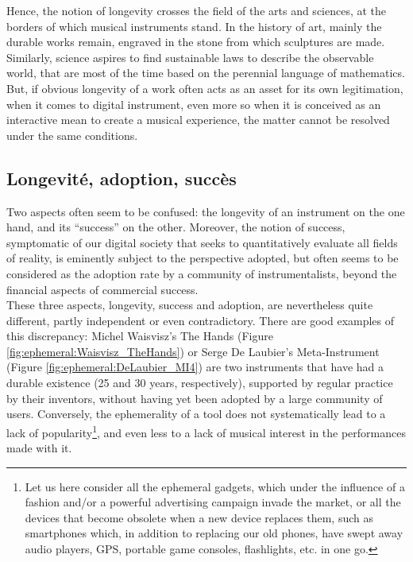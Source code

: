\indent Hence, the notion of longevity crosses the field of the arts and sciences, at the borders of which musical instruments stand. In the history of art, mainly the durable works remain, engraved in the stone from which sculptures are made. Similarly, science aspires to find sustainable laws to describe the observable world, that are most of the time based on the perennial language of mathematics. But, if obvious longevity of a work often acts as an asset for its own legitimation, when it comes to digital instrument, even more so when it is conceived as an interactive mean to create a musical experience, the matter cannot be resolved under the same conditions.
	
\subsection{Longevité, adoption, succès}
Two aspects often seem to be confused: the longevity of an instrument on the one hand, and its “success” on the other. Moreover, the notion of success, symptomatic of our digital society that seeks to quantitatively evaluate all fields of reality, is eminently subject to the perspective adopted, but often seems to be considered as the adoption rate by a community of instrumentalists, beyond the financial aspects of commercial success.\\
\indent These three aspects, longevity, success and adoption, are nevertheless quite different, partly independent or even contradictory. There are good examples of this discrepancy: Michel Waisvisz's The Hands \cite{torre_hands:_2016} (Figure \ref{fig:ephemeral:Waisvisz_TheHands}) or Serge De Laubier's Meta-Instrument \cite{couprie_meta-instrument:_2018} (Figure \ref{fig:ephemeral:DeLaubier_MI4}) are two instruments that have had a durable existence (25 and 30 years, respectively), supported by regular practice by their inventors, without having yet been adopted by a large community of users. Conversely, the ephemerality of a tool does not systematically lead to a lack of popularity\footnote{Let us here consider all the ephemeral gadgets, which under the influence of a fashion and/or a powerful advertising campaign invade the market, or all the devices that become obsolete when a new device replaces them, such as smartphones which, in addition to replacing our old phones, have swept away audio players, GPS, portable game consoles, flashlights, etc. in one go.}, and even less to a lack of musical interest in the performances made with it.\\

